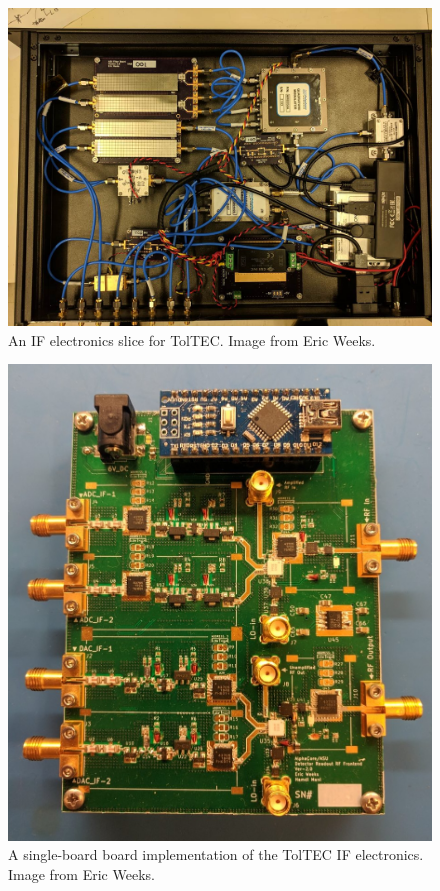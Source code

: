 \begin{figure}[!htbp]
\centering
\includegraphics[width=\textwidth]{figures/conclusion/toltec_slice_2}
\caption[~An IF electronics slice for TolTEC.]{An IF electronics slice for TolTEC\@. Image from Eric Weeks.}
\label{fig:toltec_slice}
\end{figure}

\begin{figure}[!htbp]
\centering
\includegraphics[width=\textwidth]{figures/conclusion/single_board}
\caption[~A single-board board implementation of the TolTEC IF electronics.]{A single-board board implementation of the TolTEC IF electronics. Image from Eric Weeks.}
\label{fig:single board}
\end{figure}
